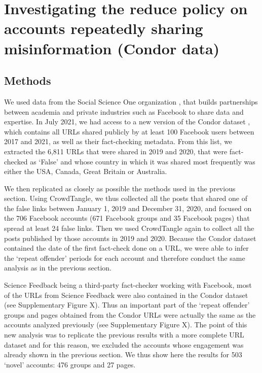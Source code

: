 \documentclass[review]{elsarticle}
\begin{document}
\section{Investigating the reduce policy on accounts repeatedly sharing misinformation (Condor data)}

\subsection{Methods}

We used data from the Social Science One organization \cite{king2020new}, that builds partnerships between academia and private industries such as Facebook to share data and expertise. 
In July 2021, we had access to a new version of the Condor dataset \cite{messing2020facebook}, which contains all URLs shared publicly by at least 100 Facebook users between 2017 and 2021, as well as their fact-checking metadata. 
From this list, we extracted the 6,811 URLs that were shared in 2019 and 2020, that were fact-checked as `False' and whose country in which it was shared most frequently was either the USA, Canada, Great Britain or Australia.

We then replicated as closely as possible the methods used in the previous section. 
Using CrowdTangle, we thus collected all the posts that shared one of the false links between January 1, 2019 and December 31, 2020, and focused on the 706 Facebook accounts (671 Facebook groups and 35 Facebook pages) that spread at least 24 false links. 
Then we used CrowdTangle again to collect all the posts published by those accounts in 2019 and 2020. 
Because the Condor dataset contained the date of the first fact-check done on a URL, we were able to infer the `repeat offender' periods for each account and therefore conduct the same analysis as in the previous section.

Science Feedback being a third-party fact-checker working with Facebook, most of the URLs from Science Feedback were also contained in the Condor dataset ({\color{red}see Supplementary Figure X}). 
Thus an important part of the `repeat offender' groups and pages obtained from the Condor URLs were actually the same as the accounts analyzed previously ({\color{red}see Supplementary Figure X}). 
The point of this new analysis was to replicate the previous results with a more complete URL dataset and for this reason, we excluded the accounts whose engagement was already shown in the previous section. 
We thus show here the results for 503 `novel' accounts: 476 groups and 27 pages.
\end{document}
